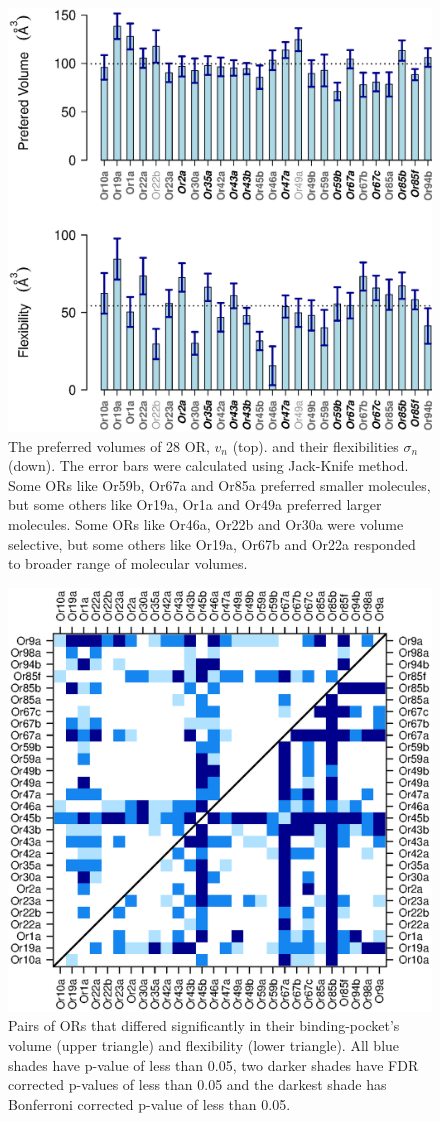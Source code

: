 \documentclass[11pt]{paper} %
\newcommand{\numberofreceptors}{ 28 }
\begin{document}
\begin{figure}
		\centering
		\includegraphics[width= 0.85  \textwidth]{vol-mean-std}
	\caption{The preferred volumes of \numberofreceptors OR, $v_n$ (top). 
		and their flexibilities $\sigma_n$ (down). 
		The error bars were calculated using Jack-Knife method. 
		Some ORs like Or59b, Or67a and  Or85a preferred smaller molecules, 
		but some others like Or19a,  Or1a and  Or49a preferred larger molecules.
		Some ORs like Or46a,  Or22b and Or30a were volume  selective, 
		but some others like Or19a,  Or67b and  Or22a responded to broader range of molecular volumes.
		}
		\label{fig:preferred_volume}
\end{figure}


\begin{figure}
	\centering
	\includegraphics[width= 0.75 \textwidth]{pair-pval}
	\caption{Pairs of ORs that differed significantly in their binding-pocket's volume (upper triangle) and flexibility (lower triangle).
			All blue shades have p-value of less than 0.05, 
			two darker shades have FDR corrected p-values of less than 0.05 and the darkest shade has Bonferroni corrected p-value of less than 0.05.}
	\label{fig:p-values}
\end{figure}
\end{document}
